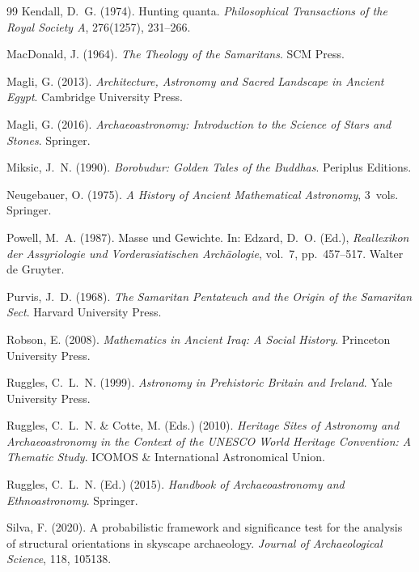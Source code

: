 \documentclass[12pt,a4paper]{article}
\begin{document}
\begin{thebibliography}{99}
Kendall, D.~G. (1974).
Hunting quanta.
\textit{Philosophical Transactions of the Royal Society A}, 276(1257), 231--266.

MacDonald, J. (1964).
\textit{The Theology of the Samaritans}.
SCM Press.

Magli, G. (2013).
\textit{Architecture, Astronomy and Sacred Landscape in Ancient Egypt}.
Cambridge University Press.

Magli, G. (2016).
\textit{Archaeoastronomy: Introduction to the Science of Stars and Stones}.
Springer.

Miksic, J.~N. (1990).
\textit{Borobudur: Golden Tales of the Buddhas}.
Periplus Editions.

Neugebauer, O. (1975).
\textit{A History of Ancient Mathematical Astronomy}, 3~vols.
Springer.

Powell, M.~A. (1987).
Masse und Gewichte.
In: Edzard, D.~O. (Ed.),
\textit{Reallexikon der Assyriologie und Vorderasiatischen Arch\"aologie},
vol.~7, pp.~457--517. Walter de Gruyter.

Purvis, J.~D. (1968).
\textit{The Samaritan Pentateuch and the Origin of the Samaritan Sect}.
Harvard University Press.

Robson, E. (2008).
\textit{Mathematics in Ancient Iraq: A Social History}.
Princeton University Press.

Ruggles, C.~L.~N. (1999).
\textit{Astronomy in Prehistoric Britain and Ireland}.
Yale University Press.

Ruggles, C.~L.~N. \& Cotte, M. (Eds.) (2010).
\textit{Heritage Sites of Astronomy and Archaeoastronomy in the Context
of the UNESCO World Heritage Convention: A Thematic Study}.
ICOMOS \& International Astronomical Union.

Ruggles, C.~L.~N. (Ed.) (2015).
\textit{Handbook of Archaeoastronomy and Ethnoastronomy}.
Springer.

Silva, F. (2020).
A probabilistic framework and significance test for the analysis
of structural orientations in skyscape archaeology.
\textit{Journal of Archaeological Science}, 118, 105138.


\end{thebibliography}
\end{document}
